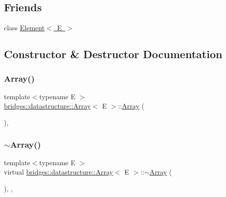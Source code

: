 \subsection*{Friends}
\begin{DoxyCompactItemize}
\item 
class \mbox{\hyperlink{classbridges_1_1datastructure_1_1_array_a8c6ff2a8dd3e27346dd25f588a78828a}{Element$<$ E $>$}}
\end{DoxyCompactItemize}


\subsection{Constructor \& Destructor Documentation}
\mbox{\label{classbridges_1_1datastructure_1_1_array_a23cb659c4f39e5e6f3b29a58e97b8e0d}} 
\subsubsection{\texorpdfstring{Array()}{Array()}\hspace{0.1cm}{\footnotesize\ttfamily [1/3]}}
{\footnotesize\ttfamily template$<$typename E $>$ \\
\mbox{\hyperlink{classbridges_1_1datastructure_1_1_array}{bridges\+::datastructure\+::\+Array}}$<$ E $>$\+::\mbox{\hyperlink{classbridges_1_1datastructure_1_1_array}{Array}} (\begin{DoxyParamCaption}{ }\end{DoxyParamCaption})\hspace{0.3cm}{\ttfamily [inline]}, {\ttfamily [protected]}}

\mbox{\label{classbridges_1_1datastructure_1_1_array_a5a9f212f560e9673259eece27d8f11cc}} 
\subsubsection{\texorpdfstring{$\sim$\+Array()}{~Array()}}
{\footnotesize\ttfamily template$<$typename E $>$ \\
virtual \mbox{\hyperlink{classbridges_1_1datastructure_1_1_array}{bridges\+::datastructure\+::\+Array}}$<$ E $>$\+::$\sim$\mbox{\hyperlink{classbridges_1_1datastructure_1_1_array}{Array}} (\begin{DoxyParamCaption}{ }\end{DoxyParamCaption})\hspace{0.3cm}{\ttfamily [inline]}, {\ttfamily [protected]}, {\ttfamily [virtual]}}

